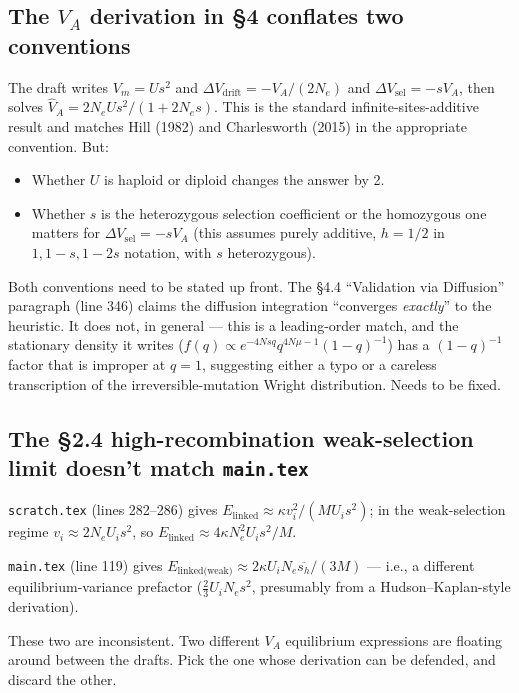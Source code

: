 \documentclass[11pt]{article}
\begin{document}
\subsection{The $V_A$ derivation in \S 4 conflates two conventions}

The draft writes $V_m = Us^2$ and $\Delta V_{\text{drift}} = -V_A/(2N_e)$
and $\Delta V_{\text{sel}} = -sV_A$, then solves
$\hat V_A = 2N_eUs^2/(1+2N_e s)$. This is the standard
infinite-sites-additive result and matches Hill (1982) and
Charlesworth (2015) in the appropriate convention. But:
\begin{itemize}
\item Whether $U$ is haploid or diploid changes the answer by 2.
\item Whether $s$ is the heterozygous selection coefficient or the
homozygous one matters for $\Delta V_{\text{sel}} = -sV_A$ (this
assumes purely additive, $h=1/2$ in $1, 1-s, 1-2s$ notation, with
$s$ heterozygous).
\end{itemize}
Both conventions need to be stated up front. The \S 4.4 ``Validation
via Diffusion'' paragraph (line 346) claims the diffusion integration
``converges \emph{exactly}'' to the heuristic. It does not, in general
--- this is a leading-order match, and the stationary density it
writes ($f(q) \propto e^{-4Nsq} q^{4N\mu - 1}(1-q)^{-1}$) has a
$(1-q)^{-1}$ factor that is improper at $q=1$, suggesting either a
typo or a careless transcription of the irreversible-mutation Wright
distribution. Needs to be fixed.

\subsection{The \S 2.4 high-recombination weak-selection limit doesn't match \texttt{main.tex}}

\texttt{scratch.tex} (lines 282--286) gives
$E_{\text{linked}} \approx \kappa v_i^2/(MU_i s^2)$; in the
weak-selection regime $v_i \approx 2 N_e U_i s^2$, so
$E_{\text{linked}} \approx 4\kappa N_e^2 U_i s^2 / M$.

\texttt{main.tex} (line 119) gives
$E_{\text{linked(weak)}} \approx 2\kappa U_i N_e \overline{s_h}/(3M)$
--- i.e., a different equilibrium-variance prefactor
($\tfrac{2}{3} U_i N_e s^2$, presumably from a Hudson--Kaplan-style
derivation).

These two are inconsistent. Two different $V_A$ equilibrium
expressions are floating around between the drafts. Pick the one
whose derivation can be defended, and discard the other.
\end{document}
